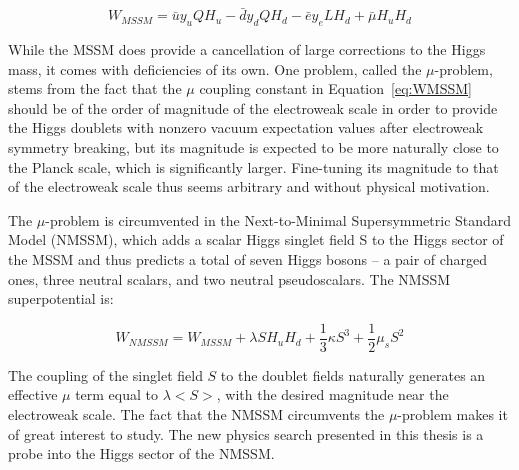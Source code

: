 \begin{equation}
W_{MSSM} = \bar{u}y_{u}QH_{u} - \bar{d}y_{d}QH_{d} - \bar{e}y_{e}LH_{d} + \bar{\mu}H_{u}H_{d}
\label{eq:WMSSM}
\end{equation}

While the MSSM does provide a cancellation of large corrections to the Higgs mass, it comes with deficiencies of its own. One problem, called the $\mu$-problem, stems from the fact that the $\mu$ coupling constant in Equation~\ref{eq:WMSSM} should be of the order of magnitude of the electroweak scale in order to provide the Higgs doublets with nonzero vacuum expectation values after electroweak symmetry breaking, but its magnitude is expected to be more naturally close to the Planck scale, which is significantly larger. Fine-tuning its magnitude to that of the electroweak scale thus seems arbitrary and without physical motivation.

The $\mu$-problem is circumvented in the Next-to-Minimal Supersymmetric Standard Model (NMSSM), which adds a scalar Higgs singlet field S to the Higgs sector of the MSSM and thus predicts a total of seven Higgs bosons -- a pair of charged ones, three neutral scalars, and two neutral pseudoscalars. The NMSSM superpotential is:

\begin{equation}
W_{NMSSM} = W_{MSSM} + \lambda SH_{u}H_{d} + \frac{1}{3}\kappa S^3 + \frac{1}{2}\mu_{s}S^2
\label{eq:WNMSSM}
\end{equation}

The coupling of the singlet field $S$ to the doublet fields naturally generates an effective $\mu$ term equal to $\lambda$$<S>$, with the desired magnitude near the electroweak scale. The fact that the NMSSM circumvents the $\mu$-problem makes it of great interest to study. The new physics search presented in this thesis is a probe into the Higgs sector of the NMSSM.